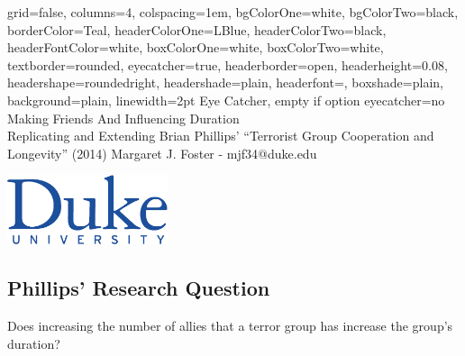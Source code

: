 \documentclass[landscape,paperheight=24in,fontscale=.45,paperwidth=36in,landscape,final]{baposter}
\begin{document}
\background{}

\begin{poster}{
  grid=false,
  columns=4,
  colspacing=1em,
  bgColorOne=white, %
  bgColorTwo=black, %
  borderColor=Teal,  %
  headerColorOne=LBlue,  %
  headerColorTwo=black,  %
  headerFontColor=white, %
  boxColorOne=white,
  boxColorTwo=white,
  textborder=rounded,
  eyecatcher=true,
  headerborder=open,
  headerheight=0.08\textheight,
  headershape=roundedright,
  headershade=plain,
  headerfont=\large\textsc, %
  boxshade=plain,
  background=plain,
  linewidth=2pt
  }
{
Eye Catcher, empty if option eyecatcher=no
}
{
\textcolor{LBlue}{Making Friends And Influencing Duration}\\ \LARGE
\textcolor{LBlue}{Replicating and Extending Brian Phillips' ``Terrorist Group Cooperation and Longevity'' (2014)}
}
{
\textcolor{LBlue}{Margaret J. Foster - mjf34@duke.edu}
}
  {{\begin{minipage}{13em}
    \hfill
    \includegraphics[height=5.5em]{DukeLogo.pdf}
  \end{minipage}}
  }


{
\subsection*{Phillips' Research Question}
Does increasing the number of allies that a terror group has
  increase the group's duration?
\vspace{-2mm}
}
\end{poster}
\end{document}
